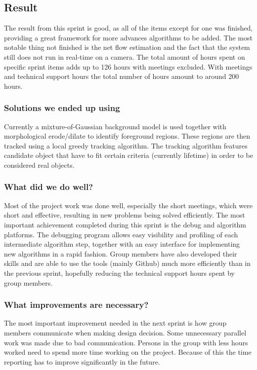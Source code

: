 \subsection{Result}
The result from this sprint is good, as all of the items except for one was finished, providing a great framework for more advances algorithms to be added. The most notable thing not finished is the net flow estimation and the fact that the system still does not run in real-time on a camera. The total amount of hours spent on specific sprint items adds up to 126 hours with meetings excluded. With meetings and technical support hours the total number of hours amount to around 200 hours.

\subsubsection{Solutions we ended up using}
Currently a mixture-of-Gaussian background model is used together with morphological erode/dilate to identify foreground regions. These regions are then tracked using a local greedy tracking algorithm. The tracking algorithm features candidate object that have to fit certain criteria (currently lifetime) in order to be considered real objects.

\subsubsection{What did we do well?}
Most of the project work was done well, especially the short meetings, which were short and effective, resulting in new problems being solved efficiently. The most important achievement completed during this sprint is the debug and algorithm platforms. The debugging program allows easy visibility and profiling of each intermediate algorithm step, together with an easy interface for implementing new algorithms in a rapid fashion. Group members have also developed their skills and are able to use the tools (mainly Github) much more efficiently than in the previous sprint, hopefully reducing the technical support hours spent by group members.

\subsubsection{What improvements are necessary?}
The most important improvement needed in the next sprint is how group members communicate when making design decision. Some unnecessary parallel work was made due to bad communication. Persons in the group with less hours worked need to spend more time working on the project. Because of this the time reporting has to improve significantly in the future.
\newpage

